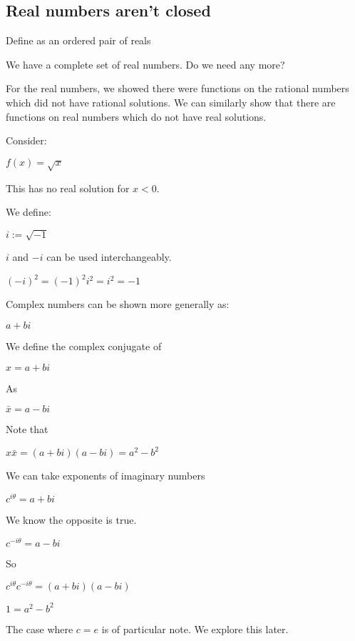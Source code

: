 
\subsection{Real numbers aren't closed}


Define as an ordered pair of reals

We have a complete set of real numbers. Do we need any more?

For the real numbers, we showed there were functions on the rational numbers which did not have rational solutions. We can similarly show that there are functions on real numbers which do not have real solutions.

Consider:

\(f(x)=\sqrt x\)

This has no real solution for \(x<0\).

We define:

\(i:=\sqrt {-1}\)

\(i\) and \(-i\) can be used interchangeably.

\((-i)^2=(-1)^2i^2=i^2=-1\)

Complex numbers can be shown more generally as:

\(a+bi\)

We define the complex conjugate of

\(x=a+bi\)

As

\(\bar x=a-bi\)

Note that

\(x\bar x=(a+bi)(a-bi)=a^2-b^2\)

We can take exponents of imaginary numbers

\(c^{i\theta}=a+bi\)

We know the opposite is true.

\(c^{-i\theta}=a-bi\)

So

\(c^{i\theta}c^{-i\theta}=(a+bi)(a-bi)\)

\(1=a^2-b^2\)

The case where \(c=e\) is of particular note. We explore this later.


